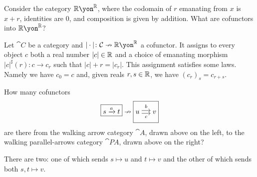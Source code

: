 \documentclass[Book-Poly]{subfiles}
\begin{document}
\begin{example}\label{ex.cof_to_rr} %
Consider the category $\rr\yon^\rr$, where the codomain of $r$ emanating from $x$ is $x+r$, identities are $0$, and composition is given by addition. What are cofunctors into $\rr\yon^\rr$?

Let $\cat{C}$ be a category and $|\cdot|\colon\cat{C}\cof\rr\yon^\rr$ a cofunctor. It assigns to every object $c$ both a real number $|c|\in\mathbb{R}$ and a choice of emanating morphism $|c|^\sharp(r)\colon c\to c_r$ such that $|c|+r=|c_r|$. This assignment satisfies some laws. Namely we have $c_0=c$ and, given reals $r,s\in\mathbb{R}$, we have $(c_r)_s=c_{r+s}$.
\end{example}


\begin{exercise}
How many cofunctors
\[
    \fbox{$s\To{a}t$}\cof\fbox{$u\Tto{b}{c}v$}
\]
are there from the walking arrow category $\cat{A}$, drawn above on the left, to the walking parallel-arrows category $\cat{P\!A}$, drawn above on the right?
\begin{solution}
There are two: one of which sends $s\mapsto u$ and $t\mapsto v$ and the other of which sends both $s,t\mapsto v$.
\end{solution}
\end{exercise}
\end{document}
